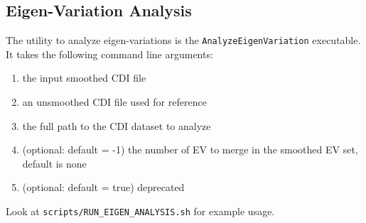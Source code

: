 \subsection{Eigen-Variation Analysis}\label{eigen-variation-analysis-1}

The utility to analyze eigen-variations is the
\texttt{AnalyzeEigenVariation} executable. It takes the following
command line arguments:

\begin{enumerate}
\def\labelenumi{\arabic{enumi}.}
\itemsep1pt\parskip0pt
\item
  the input smoothed CDI file
\item
  an unsmoothed CDI file used for reference
\item
  the full path to the CDI dataset to analyze
\item
  (optional: default = -1) the number of EV to merge in the smoothed EV
  set, default is none
\item
  (optional: default = true) deprecated
\end{enumerate}

Look at \texttt{scripts/RUN\_EIGEN\_ANALYSIS.sh} for example usage.
